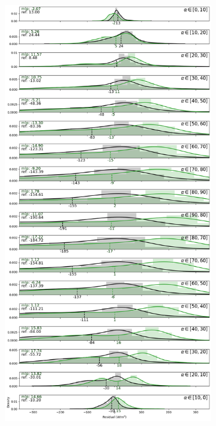 \begin{figure}[htb!]
\begin{subfigure}{\columnwidth}
    \end{subfigure}
\medskip
    \begin{subfigure}{\columnwidth}
        \includegraphics[width=\columnwidth]{figures/first_study/residual_errors_mlp_site3_rmse.png}

\end{subfigure}
\end{figure}
